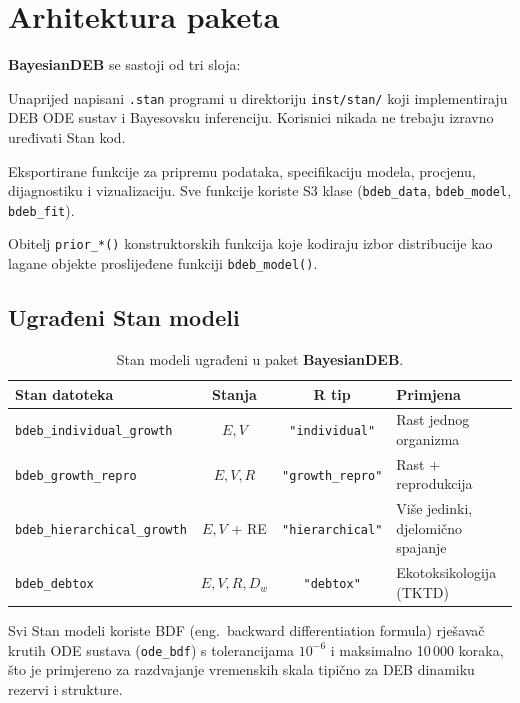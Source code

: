 \documentclass[11pt,a4paper]{article}
\newcommand{\pkg}[1]{\textbf{#1}}
\newcommand{\fn}[1]{\texttt{#1()}}
\newcommand{\code}[1]{\texttt{#1}}
\begin{document}
\section{Arhitektura paketa}
\label{sec:arhitektura}

\pkg{BayesianDEB} se sastoji od tri sloja:

\begin{description}[style=nextline]
  \item[Stan modeli] Unaprijed napisani \code{.stan} programi u direktoriju
    \code{inst/stan/} koji implementiraju DEB ODE sustav i Bayesovsku
    inferenciju.  Korisnici nikada ne trebaju izravno uređivati Stan kod.
  \item[R sučelje] Eksportirane funkcije za pripremu podataka,
    specifikaciju modela, procjenu, dijagnostiku i vizualizaciju.  Sve
    funkcije koriste S3 klase (\code{bdeb\_data}, \code{bdeb\_model},
    \code{bdeb\_fit}).
  \item[Sustav priora] Obitelj \code{prior\_*()} konstruktorskih funkcija
    koje kodiraju izbor distribucije kao lagane objekte proslijeđene
    funkciji \fn{bdeb\_model}.
\end{description}

\subsection{Ugrađeni Stan modeli}

\begin{table}[htbp]
\centering
\caption{Stan modeli ugrađeni u paket \pkg{BayesianDEB}.}
\label{tab:stan-modeli}
\begin{tabular}{lccl}
\toprule
\textbf{Stan datoteka} & \textbf{Stanja} & \textbf{R tip} & \textbf{Primjena} \\
\midrule
\code{bdeb\_individual\_growth} & $E, V$ & \code{"individual"} & Rast jednog organizma \\
\code{bdeb\_growth\_repro} & $E, V, R$ & \code{"growth\_repro"} & Rast + reprodukcija \\
\code{bdeb\_hierarchical\_growth} & $E, V$ + RE & \code{"hierarchical"} & Više jedinki, djelomično spajanje \\
\code{bdeb\_debtox} & $E, V, R, D_w$ & \code{"debtox"} & Ekotoksikologija (TKTD) \\
\bottomrule
\end{tabular}
\end{table}

Svi Stan modeli koriste BDF (eng.\ backward differentiation formula)
rješavač krutih ODE sustava (\code{ode\_bdf}) s tolerancijama $10^{-6}$
i maksimalno 10\,000 koraka, što je primjereno za razdvajanje vremenskih
skala tipično za DEB dinamiku rezervi i strukture.
\end{document}

